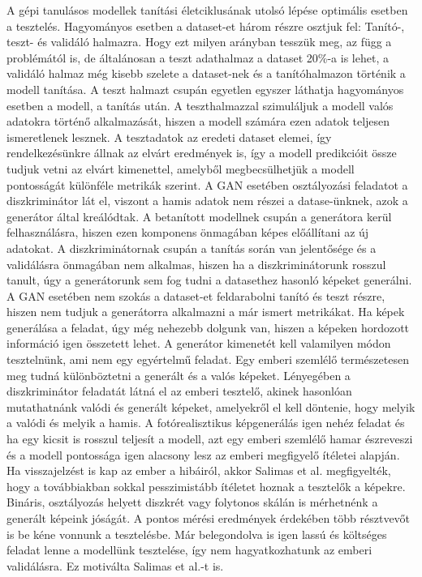 A gépi tanulásos modellek tanítási életciklusának utolsó lépése optimális esetben a tesztelés. Hagyományos esetben a dataset-et három részre osztjuk fel: Tanító-, teszt- és validáló halmazra. Hogy ezt milyen arányban tesszük meg, az függ a problémától is, de általánosan a teszt adathalmaz a dataset 20\%-a is lehet, a validáló halmaz még kisebb szelete a dataset-nek és a tanítóhalmazon történik a modell tanítása.
A teszt halmazt csupán egyetlen egyszer láthatja hagyományos esetben a modell, a tanítás után.
A teszthalmazzal szimuláljuk a modell valós adatokra történő alkalmazását, hiszen a modell számára ezen adatok teljesen ismeretlenek lesznek. A tesztadatok az eredeti dataset elemei, így rendelkezésünkre állnak az elvárt eredmények is, így a modell predikcióit össze tudjuk vetni az elvárt kimenettel, amelyből megbecsülhetjük a modell pontosságát különféle metrikák szerint.
A GAN esetében osztályozási feladatot a diszkriminátor lát el, viszont a hamis adatok nem részei a datase-ünknek, azok a generátor által kreálódtak. A betanított modellnek csupán a generátora kerül felhasználásra, hiszen ezen komponens önmagában képes előállítani az új adatokat. A diszkriminátornak csupán a tanítás során van jelentősége és a validálásra önmagában nem alkalmas, hiszen ha a diszkriminátorunk rosszul tanult, úgy a generátorunk sem fog tudni a datasethez hasonló képeket generálni.
A GAN esetében nem szokás a dataset-et feldarabolni tanító és teszt részre, hiszen nem tudjuk a generátorra alkalmazni a már ismert metrikákat.
Ha képek generálása a feladat, úgy még nehezebb dolgunk van, hiszen a képeken hordozott információ igen összetett lehet.
A generátor kimenetét kell valamilyen módon tesztelnünk, ami nem egy egyértelmű feladat.
Egy emberi szemlélő természetesen meg tudná különböztetni a generált és a valós képeket. Lényegében a diszkriminátor feladatát látná el az emberi tesztelő, akinek hasonlóan mutathatnánk valódi és generált képeket, amelyekről el kell döntenie, hogy melyik a valódi és melyik a hamis. A fotórealisztikus képgenerálás igen nehéz feladat és ha egy kicsit is rosszul teljesít a modell, azt egy emberi szemlélő hamar észreveszi és a modell pontossága igen alacsony lesz az emberi megfigyelő ítéletei alapján. Ha visszajelzést is kap az ember a hibáiról, akkor Salimas et al. megfigyelték, hogy a továbbiakban sokkal pesszimistább ítéletet hoznak a tesztelők a képekre. Bináris, osztályozás helyett diszkrét vagy folytonos skálán is mérhetnénk a generált képeink jóságát. A pontos mérési eredmények érdekében több résztvevőt is be kéne vonnunk a tesztelésbe. Már belegondolva is igen lassú és költséges feladat lenne a modellünk tesztelése, így nem hagyatkozhatunk az emberi validálásra. Ez motiválta Salimas et al.-t is.


